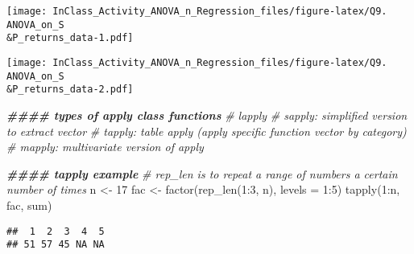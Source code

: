 \documentclass[
]{article}
\newenvironment{Shaded}{\begin{snugshade}}{\end{snugshade}}
\newcommand{\AttributeTok}[1]{\textcolor[rgb]{0.77,0.63,0.00}{#1}}
\newcommand{\CommentTok}[1]{\textcolor[rgb]{0.56,0.35,0.01}{\textit{#1}}}
\newcommand{\DecValTok}[1]{\textcolor[rgb]{0.00,0.00,0.81}{#1}}
\newcommand{\DocumentationTok}[1]{\textcolor[rgb]{0.56,0.35,0.01}{\textbf{\textit{#1}}}}
\newcommand{\FunctionTok}[1]{\textcolor[rgb]{0.00,0.00,0.00}{#1}}
\newcommand{\NormalTok}[1]{#1}
\newcommand{\OtherTok}[1]{\textcolor[rgb]{0.56,0.35,0.01}{#1}}
\newcommand{\SpecialCharTok}[1]{\textcolor[rgb]{0.00,0.00,0.00}{#1}}
\newcommand{\StringTok}[1]{\textcolor[rgb]{0.31,0.60,0.02}{#1}}
\begin{document}
\texttt{[image: InClass\_Activity\_ANOVA\_n\_Regression\_files/figure-latex/Q9. ANOVA\_on\_S\\\&P\_returns\_data-1.pdf]}

\begin{Shaded}
\end{Shaded}

\texttt{[image: InClass\_Activity\_ANOVA\_n\_Regression\_files/figure-latex/Q9. ANOVA\_on\_S\\\&P\_returns\_data-2.pdf]}

\begin{Shaded}
\begin{Highlighting}[]
\DocumentationTok{\#\#\#\# types of apply class functions}
\CommentTok{\#\textquotesingle{} lapply}
\CommentTok{\#\textquotesingle{} sapply: simplified version to extract vector}
\CommentTok{\#\textquotesingle{} tapply: table apply (apply specific function vector by category)}
\CommentTok{\#\textquotesingle{} mapply: multivariate version of apply}

\DocumentationTok{\#\#\#\# tapply example}
\CommentTok{\# rep\_len is to repeat a range of numbers a certain number of times}
\NormalTok{n }\OtherTok{\textless{}{-}} \DecValTok{17}
\NormalTok{fac }\OtherTok{\textless{}{-}} \FunctionTok{factor}\NormalTok{(}\FunctionTok{rep\_len}\NormalTok{(}\DecValTok{1}\SpecialCharTok{:}\DecValTok{3}\NormalTok{, n), }\AttributeTok{levels =} \DecValTok{1}\SpecialCharTok{:}\DecValTok{5}\NormalTok{)}
\FunctionTok{tapply}\NormalTok{(}\DecValTok{1}\SpecialCharTok{:}\NormalTok{n, fac, sum)}
\end{Highlighting}
\end{Shaded}

\begin{verbatim}
##  1  2  3  4  5 
## 51 57 45 NA NA
\end{verbatim}
\end{document}
